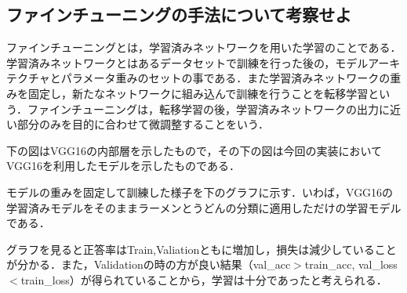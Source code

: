 \documentclass[uplatex,titlepage]{jsarticle}
\newif\iffigure
\begin{document}
\subsection{ファインチューニングの手法について考察せよ}
ファインチューニングとは，学習済みネットワークを用いた学習のことである．学習済みネットワークとはあるデータセットで訓練を行った後の，モデルアーキテクチャとパラメータ重みのセットの事である．また学習済みネットワークの重みを固定し，新たなネットワークに組み込んで訓練を行うことを転移学習という．ファインチューニングは，転移学習の後，学習済みネットワークの出力に近い部分のみを目的に合わせて微調整することをいう．\par
下の図はVGG16の内部層を示したもので，その下の図は今回の実装においてVGG16を利用したモデルを示したものである．
\iffigure
\begin{figure}[H]%
    \begin{center}
    \texttt{[image: vgg16\_model.png]} 
    \caption{VGG16モデル}
    \end{center}
\end{figure}
\fi
\iffigure
\begin{figure}[H]%
    \begin{center}
    \texttt{[image: finetyu\_before.png]} 
    \caption{ファインチューニングに用いたモデル}
    \end{center}
\end{figure}
\fi
モデルの重みを固定して訓練した様子を下のグラフに示す．いわば，VGG16の学習済みモデルをそのままラーメンとうどんの分類に適用しただけの学習モデルである．\par
グラフを見ると正答率はTrain,Valiationともに増加し，損失は減少していることが分かる．また，Validationの時の方が良い結果（val\_acc$>$train\_acc, val\_loss$<$train\_loss）が得られていることから，学習は十分であったと考えられる．
\iffigure
\begin{figure}[H]
\begin{minipage}{8cm}%
  \begin{center}
   \texttt{[image: finetyu\_acc.png]} \\
   \caption{重みを凍結して学習したときの正答率の推移}
  \end{center}
\end{minipage}
\hfill
\begin{minipage}{8cm}%
  \begin{center}
    \texttt{[image: finetyu\_loss.png]} \\
    \caption{重みを凍結して学習したときの損失の推移}
  \end{center}
\end{minipage}
\end{figure}
\fi
\end{document}
